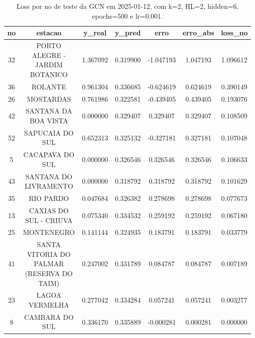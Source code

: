 \begin{table}[h]
\centering
\caption{Loss por no de teste da GCN em 2025-01-12, com k=2, HL=2, hidden=6, epochs=500 e lr=0.001.}
\label{tab:gcn_loss_k2_hl2_h6_e500_d20250112}
\begin{tabular}{ccccccc}
\toprule
no & estacao & y\_real & y\_pred & erro & erro\_abs & loss\_no \\
\midrule
32 & PORTO ALEGRE - JARDIM BOTANICO & 1.367092 & 0.319900 & -1.047193 & 1.047193 & 1.096612 \\
36 & ROLANTE & 0.961304 & 0.336685 & -0.624619 & 0.624619 & 0.390149 \\
26 & MOSTARDAS & 0.761986 & 0.322581 & -0.439405 & 0.439405 & 0.193076 \\
42 & SANTANA DA BOA VISTA & 0.000000 & 0.329407 & 0.329407 & 0.329407 & 0.108509 \\
52 & SAPUCAIA DO SUL & 0.652313 & 0.325132 & -0.327181 & 0.327181 & 0.107048 \\
5 & CACAPAVA DO SUL & 0.000000 & 0.326546 & 0.326546 & 0.326546 & 0.106633 \\
43 & SANTANA DO LIVRAMENTO & 0.000000 & 0.318792 & 0.318792 & 0.318792 & 0.101629 \\
35 & RIO PARDO & 0.047684 & 0.326382 & 0.278698 & 0.278698 & 0.077673 \\
13 & CAXIAS DO SUL - CRIUVA & 0.075340 & 0.334532 & 0.259192 & 0.259192 & 0.067180 \\
25 & MONTENEGRO & 0.141144 & 0.324935 & 0.183791 & 0.183791 & 0.033779 \\
41 & SANTA VITORIA DO PALMAR (RESERVA DO TAIM) & 0.247002 & 0.331789 & 0.084787 & 0.084787 & 0.007189 \\
23 & LAGOA VERMELHA & 0.277042 & 0.334284 & 0.057241 & 0.057241 & 0.003277 \\
8 & CAMBARA DO SUL & 0.336170 & 0.335889 & -0.000281 & 0.000281 & 0.000000 \\
\bottomrule
\end{tabular}
\end{table}

